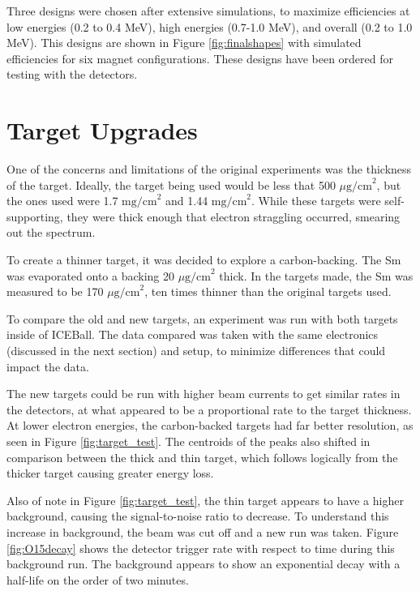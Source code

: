 Three designs were chosen after extensive simulations, to maximize efficiencies at low energies (0.2 to 0.4 MeV), high energies (0.7-1.0 MeV), and overall (0.2 to 1.0 MeV). This designs are shown in Figure \ref{fig:finalshapes} with simulated efficiencies for six magnet configurations. These designs have been ordered for testing with the detectors.



\section{Target Upgrades}

One of the concerns and limitations of the original experiments was the thickness of the target. Ideally, the target being used would be less that 500 $\mu\text{g/cm}^2$, but the ones used were 1.7 $\text{mg/cm}^2$ and 1.44 $\text{mg/cm}^2$. While these targets were self-supporting, they were thick enough that electron straggling occurred, smearing out the spectrum.

To create a thinner target, it was decided to explore a carbon-backing. The Sm was evaporated onto a backing 20 $\mu\text{g/cm}^2$ thick. In the targets made, the Sm was measured to be 170 $\mu\text{g/cm}^2$, ten times thinner than the original targets used.

To compare the old and new targets, an experiment was run with both targets inside of ICEBall. The data compared was taken with the same electronics (discussed in the next section) and setup, to minimize differences that could impact the data.

The new targets could be run with higher beam currents to get similar rates in the detectors, at what appeared to be a proportional rate to the target thickness. At lower electron energies, the carbon-backed targets had far better resolution, as seen in Figure \ref{fig:target_test}. The centroids of the peaks also shifted in comparison between the thick and thin target, which follows logically from the thicker target causing greater energy loss. 

Also of note in Figure \ref{fig:target_test}, the thin target appears to have a higher background, causing the signal-to-noise ratio to decrease. To understand this increase in background, the beam was cut off and a new run was taken. Figure \ref{fig:O15decay} shows the detector trigger rate with respect to time during this background run. The background appears to show an exponential decay with a half-life on the order of two minutes.

